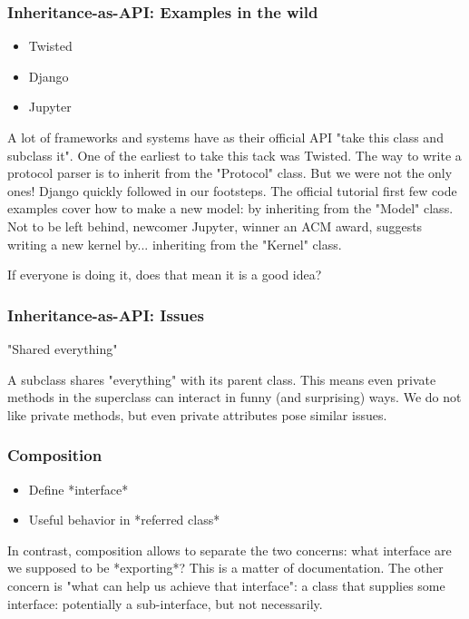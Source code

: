 \begin{frame}[fragile]
\frametitle{Inheritance-as-API: Examples in the wild}

\begin{itemize}
\item Twisted \pause
\item Django \pause
\item Jupyter
\end{itemize}

\end{frame}

A lot of frameworks and systems have as their official API
"take this class and subclass it".
One of the earliest to take this tack was Twisted.
The way to write a protocol parser is to inherit from the
"Protocol"
class.
But we were not the only ones!
Django quickly followed in our footsteps.
The official tutorial first few code examples
cover how to make a new model:
by inheriting from the
"Model"
class.
Not to be left behind,
newcomer Jupyter,
winner an ACM award,
suggests writing a new kernel
by...
inheriting from the
"Kernel"
class.

If everyone is doing it,
does that mean it is a good idea?

\begin{frame}[fragile]
\frametitle{Inheritance-as-API: Issues}

"Shared everything"
\end{frame}

A subclass shares
"everything"
with its parent class.
This means even private methods in the superclass
can interact in funny
(and surprising)
ways.
We do not like private methods,
but even private attributes pose similar issues.

\begin{frame}[fragile]
\frametitle{Composition}

\begin{itemize}
\item Define *interface*
\item Useful behavior in *referred class*
\end{itemize}

\end{frame}

In contrast,
composition allows to separate the two concerns:
what interface are we supposed to be *exporting*?
This is a matter of documentation.
The other concern is
"what can help us achieve that interface":
a class that supplies some interface:
potentially a sub-interface,
but not necessarily.

